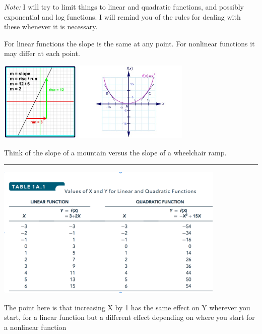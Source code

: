 \documentclass[]{article}
\begin{document}
\emph{Note:} I will try to limit things to linear and quadratic
functions, and possibly exponential and log functions. I will remind you
of the rules for dealing with these whenever it is necessary.

\bigskip

For linear functions the slope is the same at any point. For nonlinear
functions it may differ at each point.

\includegraphics[height=1.5in]{picsfigs/linearslope.jpg}
\includegraphics[height=1.5in]{picsfigs/nonlinearslope.jpg}

Think of the slope of a mountain versus the slope of a wheelchair ramp.

\begin{center}\rule{0.5\linewidth}{\linethickness}\end{center}

\includegraphics[height=2.5in]{picsfigs/linearquadratic.png}

The point here is that increasing X by 1 has the same effect on Y
wherever you start, for a linear function but a different effect
depending on where you start for a nonlinear function
\end{document}
